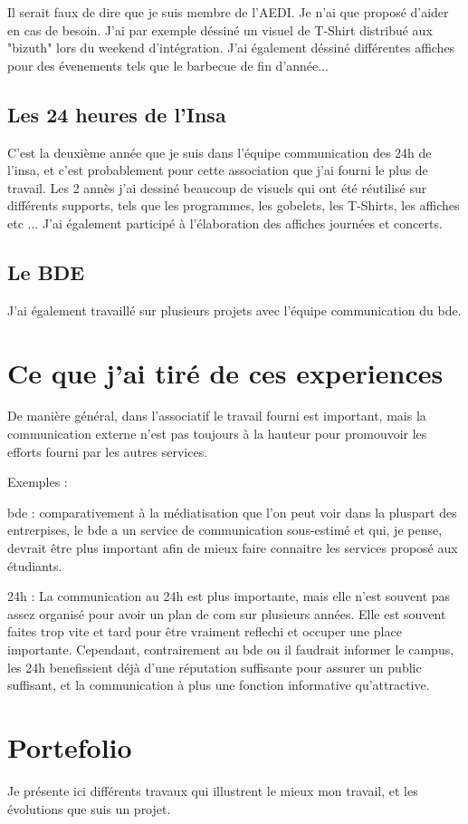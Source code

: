         Il serait faux de dire que je suis membre de l'AEDI. Je n'ai que proposé d'aider en cas de besoin.
        J'ai par exemple déssiné un visuel de T-Shirt distribué aux "bizuth" lors du weekend d'intégration.
        J'ai également déssiné différentes affiches pour des évenements tels que le barbecue de fin d'année...
        
        
    \subsection{Les 24 heures de l'Insa}
        
        C'est la deuxième année que je suis dans l'équipe communication des 24h de l'insa, et c'est probablement pour cette association que j'ai fourni le plus de travail.
        Les 2 annès j'ai dessiné beaucoup de visuels qui ont été réutilisé sur différents supports, tels que les programmes, les gobelets, les T-Shirts, les affiches etc ...
        J'ai également participé à l'élaboration des affiches journées et concerts.
        
        
    \subsection{Le BDE}
    
        J'ai également travaillé sur plusieurs projets avec l'équipe communication du bde.
        
    
    


\section{Ce que j'ai tiré de ces experiences} %

De manière général, dans l'associatif le travail fourni est important, mais la communication externe n'est pas toujours à la hauteur pour promouvoir les efforts fourni par les autres services.

Exemples :

    bde : comparativement à la médiatisation que l'on peut voir dans la pluspart des entrerpises, le bde a un service de communication sous-estimé et qui, je pense, devrait être plus important afin de mieux faire connaitre les services proposé aux étudiants.

    24h : La communication au 24h est plus importante, mais elle n'est souvent pas assez organisé pour avoir un plan de com sur plusieurs années.
Elle est souvent faites trop vite et tard pour être vraiment reflechi et occuper une place importante.
Cependant, contrairement au bde ou il faudrait informer le campus, les 24h benefissient déjà d'une réputation suffisante pour assurer un public suffisant, et la communication à plus une fonction informative qu'attractive.

\section{Portefolio}

    Je présente ici différents travaux qui illustrent le mieux mon travail, et les évolutions que suis un projet.
